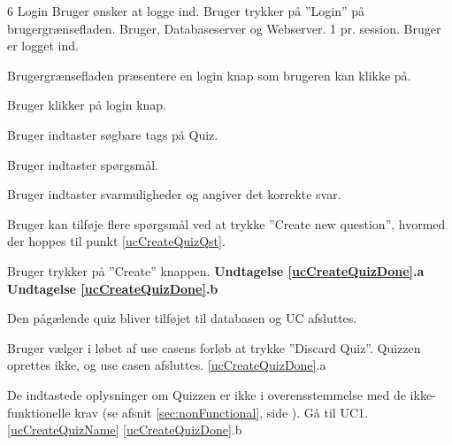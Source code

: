
\uchead
	{6}
	{Login}
	{Bruger ønsker at logge ind.}
	{Bruger trykker på ''Login'' på brugergrænsefladen.}
	{Bruger, Databaseserver og Webserver.}
	{}
	{1 pr. session.}
	{Bruger er logget ind.}

\item Brugergrænsefladen præsentere en login knap som brugeren kan klikke på.

\item \label{ucCreateQuizName} Bruger klikker på login knap.

\item Bruger indtaster søgbare tags på Quiz.

\item \label{ucCreateQuizQst} Bruger indtaster spørgsmål.

\item Bruger indtaster svarmuligheder og angiver det korrekte svar.

\item Bruger kan tilføje flere spørgsmål ved at trykke ''Create new question'', hvormed der hoppes til punkt \ref{ucCreateQuizQst}.

\item \label{ucCreateQuizDone} Bruger trykker på ''Create'' knappen.
\textbf{Undtagelse \ref{ucCreateQuizDone}.a} \textbf{Undtagelse \ref{ucCreateQuizDone}.b}

\item \label{ucCreateQuizDB} Den pågælende quiz bliver tilføjet til databasen og UC afsluttes.

\ucdescriptionend

\ucextension
	{Bruger vælger i løbet af use casens forløb at trykke ''Discard Quiz''.}
	{Quizzen oprettes ikke, og use casen afsluttes.}
	{\ref{ucCreateQuizDone}.a}
	
\ucextension
	{De indtastede oplysninger om Quizzen er ikke i overensstemmelse med de ikke-funktionelle krav (se afsnit \ref{sec:nonFunctional}, side \pageref{sec:nonFunctional}).}
	{Gå til UC1.\ref{ucCreateQuizName}}
	{\ref{ucCreateQuizDone}.b}
		
